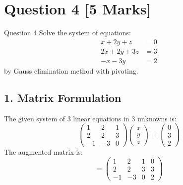 \documentclass[11pt,a4paper]{article}
\begin{document}
\newpage

\section*{Question 4 \hfill \normalsize\normalfont\color{darkgray}[5 Marks]}

\begin{questionbox}{Question 4}
Solve the system of equations:
\begin{align*}
x + 2y + z &= 0 \\
2x + 2y + 3z &= 3 \\
-x - 3y &= 2
\end{align*}
by Gauss elimination method with pivoting.
\end{questionbox}

\subsection*{1. Matrix Formulation}
The given system of 3 linear equations in 3 unknowns is:
\begin{equation}
\begin{pmatrix}
1 & 2 & 1 \\
2 & 2 & 3 \\
-1 & -3 & 0
\end{pmatrix}
\begin{pmatrix} x \\ y \\ z \end{pmatrix}
=
\begin{pmatrix} 0 \\ 3 \\ 2 \end{pmatrix}
\end{equation}
The augmented matrix is:
\begin{equation}
[A^{(0)} \mid \mathbf{b}^{(0)}] = \left(\begin{array}{ccc|c}
1 & 2 & 1 & 0 \\
2 & 2 & 3 & 3 \\
-1 & -3 & 0 & 2
\end{array}\right)
\end{equation}
\end{document}
